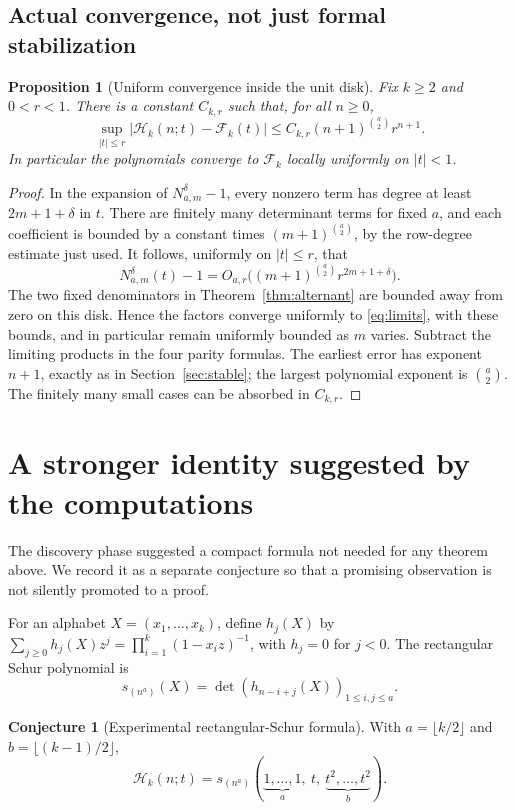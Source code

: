 \documentclass[11pt]{article}
\newtheorem{proposition}[theorem]{Proposition}
\theoremstyle{definition}
\newtheorem{conjecture}[theorem]{Conjecture}
\theoremstyle{remark}
\newcommand{\Ht}{\mathcal H}
\newcommand{\F}{\mathcal F}
\numberwithin{equation}{section}
\begin{document}
\subsection{Actual convergence, not just formal stabilization}
\begin{proposition}[Uniform convergence inside the unit disk]
\label{prop:analytic}
Fix $k\ge2$ and $0<r<1$. There is a constant $C_{k,r}$ such that, for all
$n\ge0$,
\begin{equation}
 \sup_{|t|\le r}|\Ht_k(n;t)-\F_k(t)|
 \le C_{k,r}(n+1)^{\binom a2}r^{n+1}.
 \label{eq:analytic}
\end{equation}
In particular the polynomials converge to $\F_k$ locally uniformly on
$|t|<1$.
\end{proposition}
\begin{proof}
In the expansion of $N^\delta_{a,m}-1$, every nonzero term has degree at
least $2m+1+\delta$ in $t$. There are finitely many determinant terms for
fixed $a$, and each coefficient is bounded by a constant times
$(m+1)^{\binom a2}$, by the row-degree estimate just used.
It follows, uniformly on $|t|\le r$, that
\[
 N^\delta_{a,m}(t)-1
 =O_{a,r}\bigl((m+1)^{\binom a2}r^{2m+1+\delta}\bigr).
\]
The two fixed denominators in Theorem~\ref{thm:alternant} are bounded
away from zero on this disk. Hence the factors converge uniformly to
\eqref{eq:limits}, with these bounds, and in particular remain uniformly
bounded as $m$ varies. Subtract the limiting products in the four parity
formulas. The earliest error has exponent $n+1$, exactly as in
Section~\ref{sec:stable}; the largest polynomial exponent is $\binom a2$.
The finitely many small cases can be absorbed in $C_{k,r}$.
\end{proof}

\section{A stronger identity suggested by the computations}
\label{sec:schur}

The discovery phase suggested a compact formula not needed for any theorem
above. We record it as a separate conjecture so that a promising observation
is not silently promoted to a proof.

For an alphabet $X=(x_1,\ldots,x_k)$, define $h_j(X)$ by
$\sum_{j\ge0}h_j(X)z^j=\prod_{i=1}^k(1-x_i z)^{-1}$, with $h_j=0$ for
$j<0$. The rectangular Schur polynomial is
\[
 s_{(n^a)}(X)=\det(h_{n-i+j}(X))_{1\le i,j\le a}.
\]

\begin{conjecture}[Experimental rectangular-Schur formula]
\label{conj:schur}
With $a=\lfloor k/2\rfloor$ and $b=\lfloor(k-1)/2\rfloor$,
\begin{equation}
 \Ht_k(n;t)=s_{(n^a)}
 (\underbrace{1,\ldots,1}_{a},\ t,\
 \underbrace{t^2,\ldots,t^2}_{b}).
 \label{eq:schur-candidate}
\end{equation}
\end{conjecture}
\end{document}
